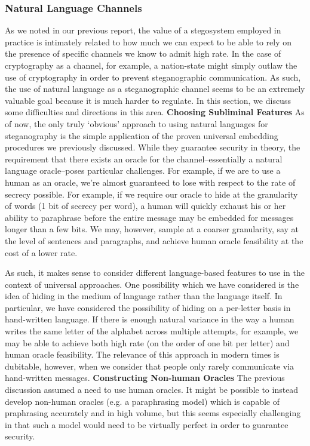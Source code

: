 \documentclass{article}
\begin{document}
\subsubsection{Natural Language Channels}

As we noted in our previous report, the value of a stegosystem employed in 
practice is intimately related to how much we can expect to be able to rely 
on the presence of specific channels we know to admit high rate.  In the 
case of cryptography as a channel, for example, a nation-state might 
simply outlaw the use of cryptography in order to prevent steganographic communication.
As such, the use of natural language as a steganographic channel seems to be an 
extremely valuable goal because it is much harder to regulate.  In this section, we discuss some difficulties and directions in this area.
\newline\newline
\noindent \textbf{Choosing Subliminal Features } As of now, the only 
truly `obvious' approach to using natural languages for steganography is the simple 
application of the proven universal embedding procedures we previously discussed.
While they guarantee security in theory, the requirement that there 
exists an oracle for the channel--essentially a natural language oracle--poses 
particular challenges.  For example, if we are to use a human as an oracle, we're 
almost guaranteed to lose with respect to the rate of secrecy possible.  For example, if 
we require our oracle to hide at the granularity of words 
(1 bit of secrecy per word), a human will quickly exhaust his or her ability to paraphrase before the 
entire message may be embedded for messages longer than a few bits.  We may, however, sample at a coarser granularity,
say at the level of sentences and paragraphs, and achieve human oracle feasibility at the cost of a lower rate.

As such, it makes sense to consider different language-based features to use 
in the context of universal approaches.  One possibility which we have considered
is the idea of hiding in the medium of language rather than the language itself.
In particular, we have considered the possibility of hiding on a per-letter basis 
in hand-written language.  If there is enough natural variance in the way a human
writes the same letter of the alphabet across multiple attempts, for example, 
we may be able to achieve both high rate (on the order of one bit 
per letter) and human oracle feasibility.  The relevance of this approach 
in modern times is dubitable, however, when we consider that people only rarely
communicate via hand-written messages.
\newline\newline
\noindent \textbf{Constructing Non-human Oracles } The previous discussion 
assumed a need to use human oracles.  It might be possible to instead develop 
non-human oracles (e.g. a paraphrasing model) which is capable of praphrasing
accurately and in high volume, but this seems especially challenging in that 
such a model would need to be virtually perfect in order to guarantee security.
\end{document}
